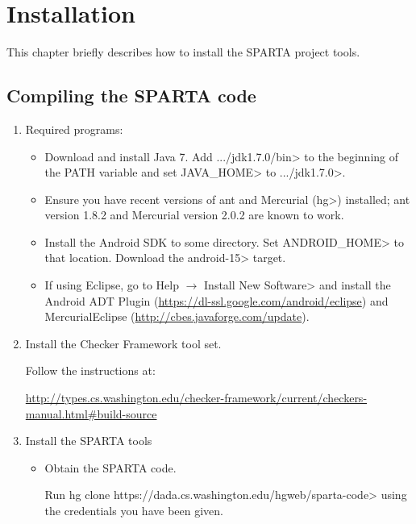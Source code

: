 \htmlhr
\chapter{Installation\label{installation}}

This chapter briefly describes how to install the SPARTA project tools.

\section{Compiling the SPARTA code}

\begin{enumerate}

\item Required programs:

\begin{itemize}
\item Download and install Java 7. Add \<.../jdk1.7.0/bin> to the
  beginning of the PATH variable and set \<JAVA\_HOME> to
  \<.../jdk1.7.0>.

\item Ensure you have recent versions of ant and Mercurial (\<hg>) installed;
  ant version 1.8.2 and Mercurial version 2.0.2 are known to work.

\item Install the Android SDK to some directory. Set \<ANDROID\_HOME> to that
  location.
  Download the \<android-15> target.

\item If using Eclipse, go to
\<Help $\rightarrow$ Install New Software>
and install the Android ADT Plugin (\url{https://dl-ssl.google.com/android/eclipse}) and MercurialEclipse (\url{http://cbes.javaforge.com/update}).

\end{itemize}


\item Install the Checker Framework tool set.

Follow the instructions at:

\url{http://types.cs.washington.edu/checker-framework/current/checkers-manual.html#build-source}


\item
Install the SPARTA tools

\begin{itemize}
\item
 Obtain the SPARTA code.

 Run \<hg clone https://dada.cs.washington.edu/hgweb/sparta-code>
 using the credentials you have been given.


\end{itemize}
\end{enumerate}
